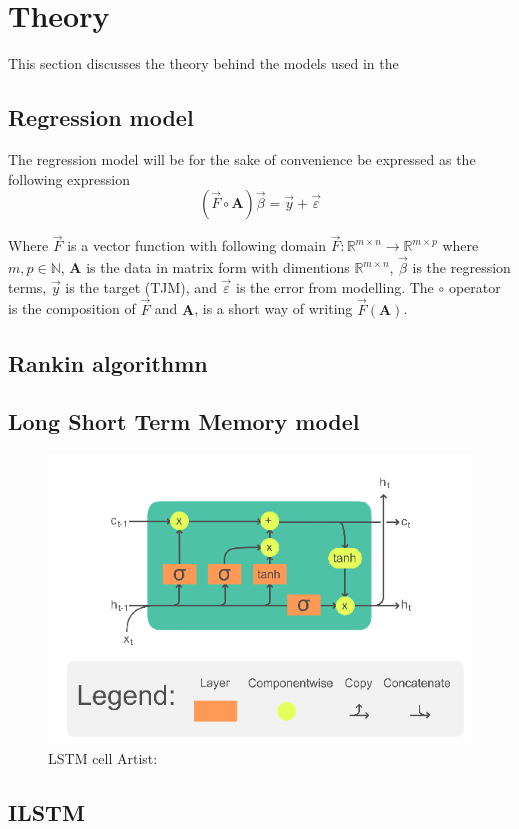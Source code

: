 \section{Theory}\label{sec:theory}

This section discusses the theory behind the models used in the 

\subsection{Regression model}

The regression model will be for the sake of convenience be expressed as the following expression
$$
\left(\vec{F}\circ \mathbf{A}\right)\vec{\beta}=\vec{y}+\vec{\varepsilon}
$$

Where $\vec{F}$ is a vector function with following domain $\vec{F}:\mathbb{R}^{m\times n}\to \mathbb{R}^{m\times p}$ where $m,p\in \mathbb{N}$, $\mathbf{A}$ is the data in matrix form with dimentions $\mathbb{R}^{m\times n}$, $\vec{\beta}$ is the regression terms, $\vec{y}$ is the target (TJM), and $\vec{\varepsilon}$ is the error from modelling. The $\circ$ operator is the composition of $\vec{F}$ and $\mathbf{A}$, is a short way of writing $\vec{F}(\mathbf{A})$.

\subsection{Rankin algorithmn}\cite{rankinen_simple_2004}


\subsection{Long Short Term Memory model}

\begin{figure}[ht]
	\centering
	\includegraphics[width=0.7\linewidth]{figures/LSTM_Cell}
	\caption{LSTM cell  Artist: \textcite{chevalier_english_2018}}
	\label{fig:lstmcell}
\end{figure}

\subsection{ILSTM}

